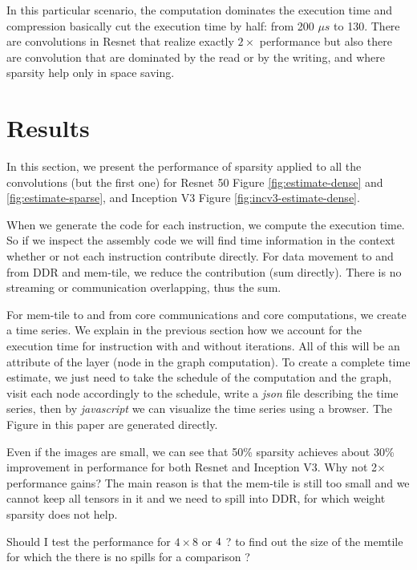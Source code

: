 \documentclass[conference]{IEEEtran}
\begin{document}
In this particular scenario, the computation dominates the execution
time and compression basically cut the execution time by half: from
200 $\mu s$ to 130. There are convolutions in Resnet that realize
exactly $2\times$ performance but also there are convolution that are
dominated by the read or by the writing, and where sparsity help only
in space saving.


\section{Results}
\label{sec:experiments}
In this section, we present the performance of sparsity applied to all
the convolutions (but the first one) for Resnet 50 Figure
\ref{fig:estimate-dense} and \ref{fig:estimate-sparse}, and Inception
V3 Figure \ref{fig:incv3-estimate-dense}.

When we generate the code for each instruction, we compute the
execution time. So if we inspect the assembly code we will find time
information in the context whether or not each instruction contribute
directly. For data movement to and from DDR and mem-tile, we reduce
the contribution (sum directly). There is no streaming or
communication overlapping, thus the sum.

For mem-tile to and from core communications and core computations, we
create a time series. We explain in the previous section how we
account for the execution time for instruction with and without
iterations. All of this will be an attribute of the layer (node in the
graph computation).  To create a complete time estimate, we just need
to take the schedule of the computation and the graph, visit each node
accordingly to the schedule, write a {\em json} file describing the
time series, then by {\em javascript} we can visualize the time series
using a browser. The Figure in this paper are generated directly.


Even if the images are small, we can see that 50\% sparsity achieves
about 30\% improvement in performance for both Resnet and Inception
V3. Why not 2$\times$ performance gains? The main reason is that the
mem-tile is still too small and we cannot keep all tensors in it and
we need to spill into DDR, for which weight sparsity does not help. 



Should I test the performance for $4\times 8$ or $4\time 6$ ? to find
out the size of the memtile for which the there is no spills for a
comparison ?
\end{document}
